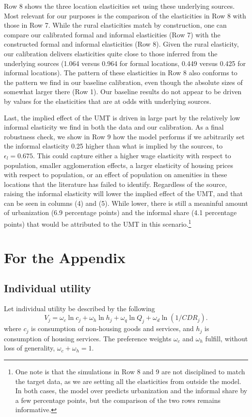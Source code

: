 \documentclass[10pt]{article}
\begin{document}
Row 8 shows the three location elasticities set using these underlying sources. Most relevant for our purposes is the comparison of the elasticities in Row 8 with those in Row 7. While the rural elasticities match by construction, one can compare our calibrated formal and informal elasticities (Row 7) with the constructed formal and informal elasticities (Row 8). Given the rural elasticity, our calibration delivers elasticities quite close to those inferred from the underlying sources (1.064 versus 0.964 for formal locations, 0.449 versus 0.425 for informal locations). The pattern of these elasticities in Row 8 also conforms to the pattern we find in our baseline calibration, even though the absolute sizes of somewhat larger there (Row 1). Our baseline results do not appear to be driven by values for the elasticities that are at odds with underlying sources. 

Last, the implied effect of the UMT is driven in large part by the relatively low informal elasticity we find in both the data and our calibration. As a final robustness check, we show in Row 9 how the model performs if we arbitrarily set the informal elasticity 0.25 higher than what is implied by the sources, to $\epsilon_l = 0.675$. This could capture either a higher wage elasticity with respect to population, smaller agglomeration effects, a larger elasticity of housing prices with respect to population, or an effect of population on amenities in these locations that the literature has failed to identify. Regardless of the source, raising the informal elasticity will lower the implied effect of the UMT, and that can be seen in columns (4) and (5). While lower, there is still a meaninful amount of urbanization (6.9 percentage points) and the informal share (4.1 percentage points) that would be attributed to the UMT in this scenario.\footnote{One note is that the simulations in Row 8 and 9 are not disciplined to match the target data, as we are setting all the elasticities from outside the model. In both cases, the model over predicts urbanization and the informal share by a few percentage points, but the comparison of the two rows remains informative.}

\section{For the Appendix}
\subsection{Individual utility}
Let individual utility be described by the following
\begin{equation}
    V_j = \omega_c \ln c_j + \omega_h \ln h_j + \omega_q \ln Q_j + \omega_d \ln (1/CDR_j).
\end{equation}
where $c_j$ is consumption of non-housing goods and services, and $h_j$ is consumption of housing services. The preference weights $\omega_c$ and $\omega_h$ fulfill, without loss of generality, $\omega_c + \omega_h = 1$. 
\end{document}
